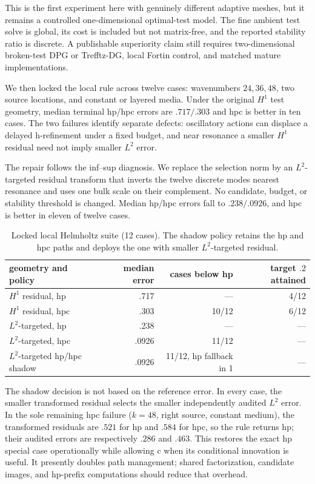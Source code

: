 \documentclass[11pt]{article}
\numberwithin{algorithm}{section}
\theoremstyle{definition}\newtheorem{definition}[theorem]{Definition}
\theoremstyle{remark}\newtheorem{remark}[theorem]{Remark}
\begin{document}
This is the first experiment here with genuinely different adaptive meshes,
but it remains a controlled one-dimensional optimal-test model. The fine
ambient test solve is global, its cost is included but not matrix-free, and the
reported stability ratio is discrete. A publishable superiority claim still
requires two-dimensional broken-test DPG or Trefftz-DG, local Fortin control,
and matched mature implementations.

We then locked the local rule across twelve cases: wavenumbers $24,36,48$, two
source locations, and constant or layered media. Under the original $H^1$
test geometry, median terminal hp/hpc errors are $.717/.303$ and hpc is better
in ten cases. The two failures identify separate defects: oscillatory actions
can displace a delayed h-refinement under a fixed budget, and near resonance a
smaller $H^1$ residual need not imply smaller $L^2$ error.

The repair follows the inf--sup diagnosis. We replace the selection norm by an
$L^2$-targeted residual transform that inverts the twelve discrete modes
nearest resonance and uses one bulk scale on their complement. No candidate,
budget, or stability threshold is changed. Median hp/hpc errors fall to
$.238/.0926$, and hpc is better in eleven of twelve cases.

\begin{table}[t]
\centering
\caption{Locked local Helmholtz suite (12 cases). The shadow policy retains
the hp and hpc paths and deploys the one with smaller $L^2$-targeted residual.}
\begin{tabular}{lrrr}
\toprule
geometry and policy & median error & cases below hp & target $.2$ attained\\
\midrule
$H^1$ residual, hp & .717 & --- & 4/12\\
$H^1$ residual, hpc & .303 & 10/12 & 6/12\\
$L^2$-targeted, hp & .238 & --- & ---\\
$L^2$-targeted, hpc & .0926 & 11/12 & ---\\
$L^2$-targeted hp/hpc shadow & .0926 & 11/12, hp fallback in 1 & ---\\
\bottomrule
\end{tabular}
\label{tab:local-dpg-l2-patch}
\end{table}

The shadow decision is not based on the reference error. In every case, the
smaller transformed residual selects the smaller independently audited $L^2$
error. In the sole remaining hpc failure ($k=48$, right source, constant
medium), the transformed residuals are $.521$ for hp and $.584$ for hpc, so
the rule returns hp; their audited errors are respectively $.286$ and $.463$.
This restores the exact hp special case operationally while allowing c when
its conditional innovation is useful. It presently doubles path management;
shared factorization, candidate images, and hp-prefix computations should
reduce that overhead.
\end{document}

